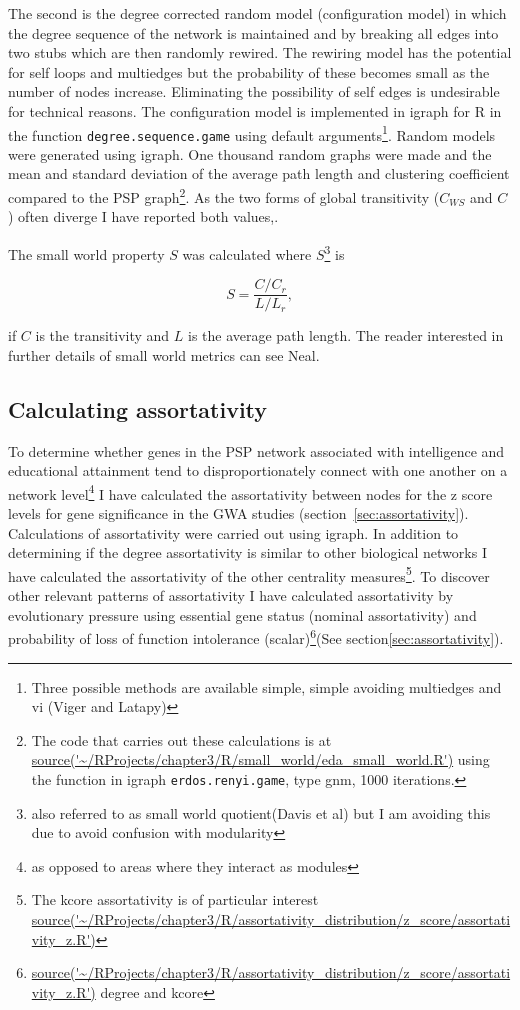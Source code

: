 The second is the degree corrected random model (configuration model) in which the degree sequence of the network is maintained and by breaking all edges into two stubs which are then randomly rewired. The rewiring model has the potential for self loops and multiedges but the probability of these becomes small as the number of nodes increase. Eliminating the possibility of self edges is undesirable for technical reasons. The configuration model is implemented in igraph for R in the function \texttt{degree.sequence.game} using default arguments\footnote{Three possible methods are available simple, simple avoiding multiedges and vi (Viger and Latapy)}. Random models were generated using igraph. One thousand random graphs were made and the mean and standard deviation of the average path length and clustering coefficient compared to the PSP graph\footnote{The code that carries out these calculations is at \url{source('~/RProjects/chapter3/R/small_world/eda_small_world.R')}
using the function in igraph \texttt{erdos.renyi.game}, type gnm, 1000 iterations.}. As the two forms of global transitivity ($C_{WS}$ and $C$) often diverge I have reported both values\cite{estrada2016local},\cite{humphries2008network}. 

The small world property $S$ was calculated where $S$\footnote{also referred to as small world quotient(Davis et al) but I am avoiding this due to avoid confusion with modularity} is

\begin{equation}
    S = \frac{C/C_r}{L/L_r},
    \label{eq:small worldness}
\end{equation}

if $C$ is the transitivity and $L$ is the average path length. The reader interested in further details of small world metrics can see Neal\cite{neal2017small}. 
 
\subsection{Calculating assortativity}
\label{sec:Assortativity methods}
To determine whether genes in the PSP network associated with intelligence and educational attainment tend to disproportionately connect with one another on a network level\footnote{as opposed to areas where they interact as modules} I have calculated the assortativity between nodes for the z score levels for gene significance in the GWA studies (section~\ref{sec:assortativity}). Calculations of assortativity were carried out using igraph. In addition to determining if the degree assortativity is similar to other biological networks I have calculated the assortativity of the other centrality measures\footnote{ The kcore assortativity is of particular interest \url{source('~/RProjects/chapter3/R/assortativity_distribution/z_score/assortativity_z.R')}}. To discover other relevant patterns of assortativity I have calculated assortativity by evolutionary pressure using essential gene status (nominal assortativity) and probability of loss of function intolerance (scalar)\footnote{  \url{source('~/RProjects/chapter3/R/assortativity_distribution/z_score/assortativity_z.R')} degree and kcore }(See section\ref{sec:assortativity}).

